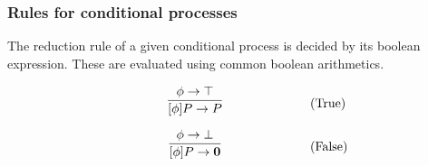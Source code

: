 \FloatBarrier

\subsubsection{Rules for conditional processes}
The reduction rule of a given conditional process is decided by its boolean expression. These are evaluated using common boolean arithmetics.

\begin{align}
	& \infrule{\phi \ra \top}{[\phi]P\ra P} \tag{True}\\
	& \infrule{\phi \ra \bot}{[\phi]P\ra \nil} \tag{False}
\end{align}
	

\FloatBarrier



